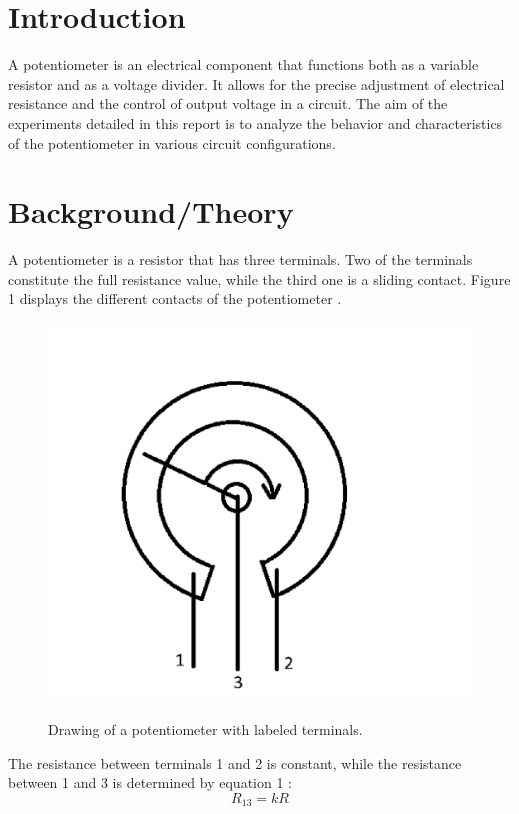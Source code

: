 \documentclass[a4paper]{article}
\begin{document}
\section{Introduction}
A potentiometer is an electrical component that functions both as a variable resistor and as a voltage divider.
It allows for the precise adjustment of electrical resistance and the control of output voltage in a circuit. 
The aim of the experiments detailed in this report is to analyze the behavior and characteristics of the potentiometer
in various circuit configurations.
\section{Background/Theory}
A potentiometer is a resistor that has three terminals. Two of the terminals
constitute the full resistance value, while the third one is a sliding contact.
Figure 1 displays the different contacts of the potentiometer \cite{report}.
\begin{figure}[!ht]
    \centering
    \begin{minipage}{0.4\textwidth}
        \includegraphics[width = \textwidth]{potterminals.png}
       \label{fig:1}
        \caption{\centering Drawing of a potentiometer with labeled terminals.}    
    \end{minipage}
\end{figure}

The resistance between terminals 1 and 2 is constant, while the resistance
between 1 and 3 is determined by equation 1 \cite{report}:
\begin{equation}
    R_{13} = kR
\end{equation}
\end{document}
